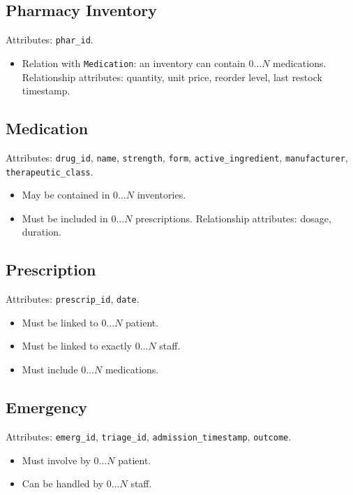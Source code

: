 \documentclass[a4paper,12pt]{article}
\begin{document}
\subsection*{Pharmacy Inventory}
Attributes: \texttt{phar\_id}.  
\begin{itemize}
    \item Relation with \texttt{Medication}: an inventory can contain $0\dots N$ medications.  
    Relationship attributes: quantity, unit price, reorder level, last restock timestamp.
\end{itemize}

\subsection*{Medication}
Attributes: \texttt{drug\_id}, \texttt{name}, \texttt{strength}, \texttt{form}, \texttt{active\_ingredient}, \texttt{manufacturer}, \texttt{therapeutic\_class}.  
\begin{itemize}
    \item May be contained in $0\dots N$ inventories.
    \item Must be included in $0\dots N$ prescriptions.  
    Relationship attributes: dosage, duration.
\end{itemize}

\subsection*{Prescription}
Attributes: \texttt{prescrip\_id}, \texttt{date}.  
\begin{itemize}
    \item Must be linked to $0\dots N$ patient.
    \item Must be linked to exactly $0\dots N$ staff.
    \item Must include $0\dots N$ medications.
\end{itemize}

\subsection*{Emergency}
Attributes: \texttt{emerg\_id}, \texttt{triage\_id}, \texttt{admission\_timestamp}, \texttt{outcome}.  
\begin{itemize}
    \item Must involve by $0\dots N$ patient.
    \item Can be handled by $0\dots N$ staff.
\end{itemize}
\end{document}
